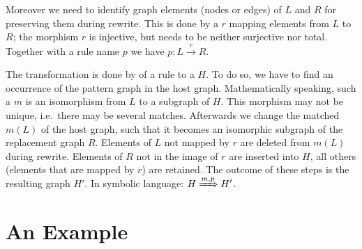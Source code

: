Moreover we need to identify graph elements (nodes or edges) of $L$ and $R$ for preserving them during rewrite. 
This is done by a  $r$ mapping elements from $L$ to $R$; the morphism $r$ is injective, but needs to be neither surjective nor total.
Together with a rule name $p$ we have $p : L \xrightarrow{r} R$.

The transformation is done by  of a rule to a  $H$.
To do so, we have to find an occurrence of the pattern graph in the host graph. 
Mathematically speaking, such a  $m$ is an isomorphism from $L$ to a subgraph of $H$.
This morphism may not be unique, i.e.\ there may be several matches.
Afterwards we change the matched  $m(L)$ of the host graph, such that it becomes an isomorphic subgraph of the replacement graph $R$.
Elements of $L$ not mapped by $r$ are deleted from $m(L)$ during rewrite.
Elements of $R$ not in the image of $r$ are inserted into $H$, all others (elements that are mapped by $r$) are retained.
The outcome of these steps is the resulting graph $H'$. In symbolic language: $H \xRightarrow{m, p} H'$.


\section{An Example}
\label{ov:example}

